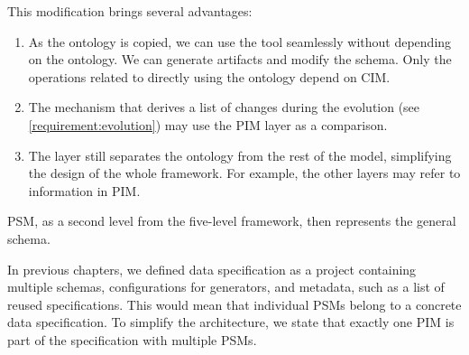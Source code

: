 This modification brings several advantages:
\begin{enumerate}
    \item As the ontology is copied, we can use the tool seamlessly without depending on the ontology. We can generate artifacts and modify the schema. Only the operations related to directly using the ontology depend on CIM.
    \item The mechanism that derives a list of changes during the evolution (see \autoref{requirement:evolution}) may use the PIM layer as a comparison.
    \item The layer still separates the ontology from the rest of the model, simplifying the design of the whole framework. For example, the other layers may refer to information in PIM.
\end{enumerate}

PSM, as a second level from the five-level framework, then represents the general schema.

In previous chapters, we defined data specification as a project containing multiple schemas, configurations for generators, and metadata, such as a list of reused specifications. This would mean that individual PSMs belong to a concrete data specification. To simplify the architecture, we state that exactly one PIM is part of the specification with multiple PSMs.

